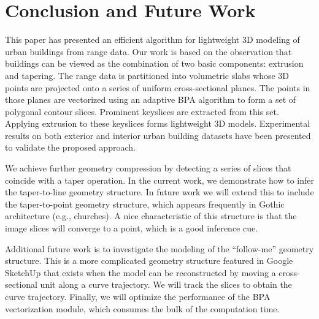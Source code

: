 

\section{Conclusion and Future Work}

This paper has presented an efficient algorithm for lightweight 3D modeling
of urban buildings from range data.
Our work is based on the observation that buildings can be viewed as the
combination of two basic components: extrusion and tapering.
The range data is partitioned into volumetric slabs whose 3D points are
projected onto a series of uniform cross-sectional planes.
The points in those planes are vectorized using an adaptive BPA algorithm
to form a set of polygonal contour slices.
Prominent keyslices are extracted from this set.
Applying extrusion to these keyslices forms lightweight 3D models.
Experimental results on both exterior and interior urban building datasets
have been presented to validate the proposed approach.

We achieve further geometry compression by detecting a series of
slices that coincide with a taper operation.
In the current work, we demonstrate how to infer the taper-to-line
geometry structure.
In future work we will extend this to include the taper-to-point geometry
structure, which appears frequently in Gothic architecture (e.g., churches).
A nice characteristic of this structure is that the image slices will converge
to a point, which is a good inference cue.

Additional future work is to investigate the modeling of the ``follow-me''
geometry structure.
This is a more complicated geometry structure featured in Google SketchUp
that exists when the model can be reconstructed by moving a cross-sectional
unit along a curve trajectory.
We will track the slices to obtain the curve trajectory.
Finally, we will optimize the performance of the BPA vectorization module,
which consumes the bulk of the computation time.

